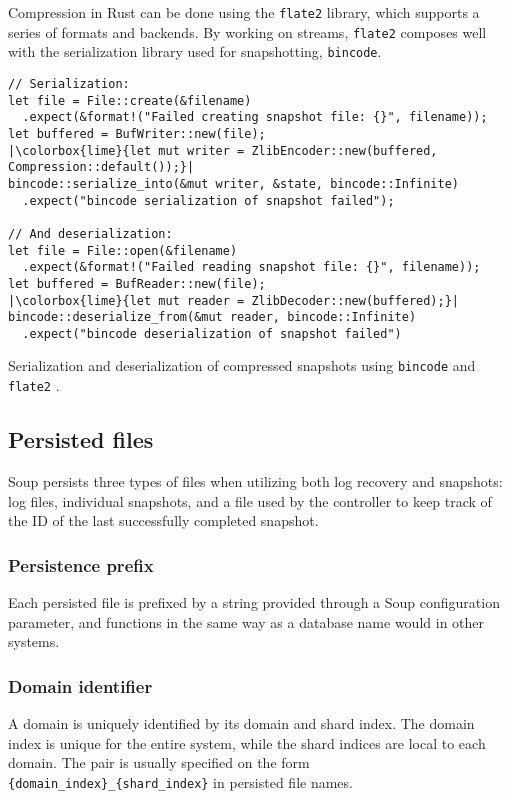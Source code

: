 \documentclass[b5paper]{report}
\begin{document}
Compression in Rust can be done using the \texttt{flate2} \cite{flate2} library,
which supports a series of formats and backends. By working on streams,
\texttt{flate2} composes well with the serialization library used for
snapshotting, \texttt{bincode}.

\begin{listing}[H]
  \begin{verbatim}
// Serialization:
let file = File::create(&filename)
  .expect(&format!("Failed creating snapshot file: {}", filename));
let buffered = BufWriter::new(file);
|\colorbox{lime}{let mut writer = ZlibEncoder::new(buffered, Compression::default());}|
bincode::serialize_into(&mut writer, &state, bincode::Infinite)
  .expect("bincode serialization of snapshot failed");

// And deserialization:
let file = File::open(&filename)
  .expect(&format!("Failed reading snapshot file: {}", filename));
let buffered = BufReader::new(file);
|\colorbox{lime}{let mut reader = ZlibDecoder::new(buffered);}|
bincode::deserialize_from(&mut reader, bincode::Infinite)
  .expect("bincode deserialization of snapshot failed")
  \end{verbatim}
  \caption{
    Serialization and deserialization of compressed snapshots using
    \texttt{bincode} \cite{bincode} and \texttt{flate2} \cite{flate2}.
  }
\end{listing}

\subsection{Persisted files}
Soup persists three types of files when utilizing both log recovery and
snapshots: log files, individual snapshots, and a file used by the controller to
keep track of the ID of the last successfully completed snapshot.

\subsubsection{Persistence prefix}
Each persisted file is prefixed by a string provided through a Soup
configuration parameter, and functions in the same way as a database name would
in other systems.

\subsubsection{Domain identifier}
A domain is uniquely identified by its domain and shard index. The domain
index is unique for the entire system, while the shard indices are local to each
domain. The pair is usually specified on the form
\texttt{\{domain\_index\}\_\{shard\_index\}} in persisted file names.
\end{document}
